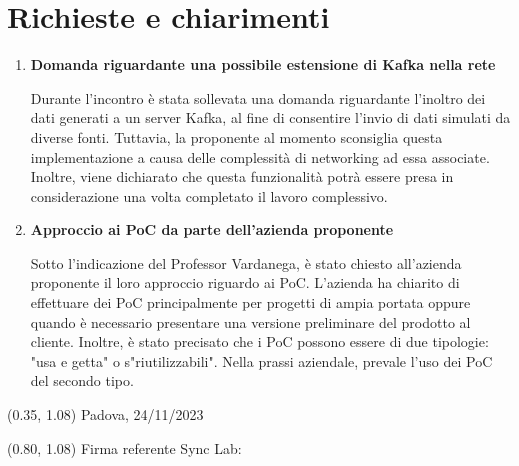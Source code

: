 \documentclass{article}
\begin{document}
\section{Richieste e chiarimenti}
\begin{enumerate}
    \item \textbf{Domanda riguardante una possibile estensione di Kafka nella rete}
    
    Durante l'incontro è stata sollevata una domanda riguardante l'inoltro dei dati generati a un server Kafka, al fine di consentire l'invio di dati simulati da diverse fonti. Tuttavia, la proponente al momento sconsiglia questa implementazione a causa delle complessità di networking ad essa associate. 
    Inoltre, viene dichiarato che questa funzionalità potrà essere presa in considerazione una volta completato il lavoro complessivo.

    \item \textbf{Approccio ai PoC da parte dell'azienda proponente}
    
    Sotto l'indicazione del Professor Vardanega, è stato chiesto all’azienda proponente il loro approccio riguardo ai PoC. L'azienda ha chiarito di effettuare dei PoC principalmente per progetti di ampia portata oppure quando è necessario presentare una versione preliminare del prodotto al cliente. Inoltre, è stato precisato che i PoC possono essere di due tipologie: "usa e getta" o s"riutilizzabili". Nella prassi aziendale, prevale l'uso dei PoC del secondo tipo.

\end{enumerate}
    
    
    
\begin{textblock*}{\textwidth}(0.35\textwidth, 1.08\textheight)
    Padova, 24/11/2023
\end{textblock*}

\begin{textblock*}{\textwidth}(0.80\textwidth, 1.08\textheight)
        Firma referente Sync Lab:
\end{textblock*}
\end{document}
